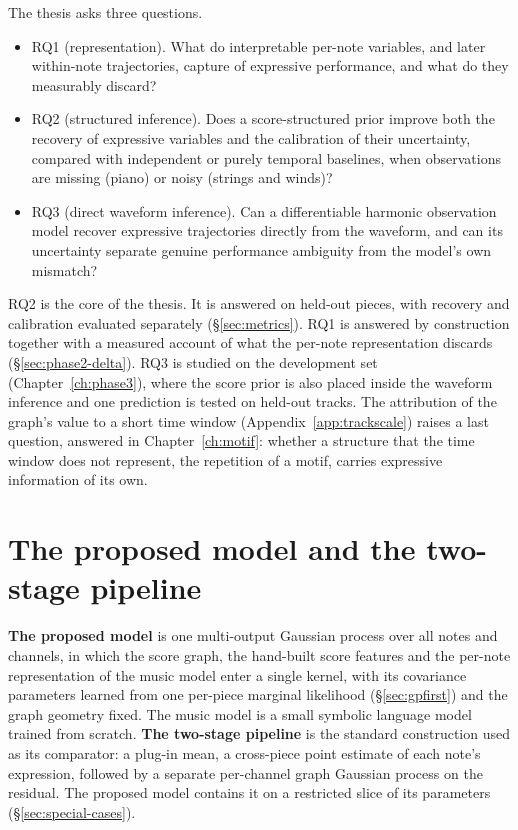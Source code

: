 \documentclass[11pt,a4paper]{report}
\begin{document}
The thesis asks three questions.
\begin{itemize}
  \item RQ1 (representation). What do interpretable per-note variables,
        and later within-note trajectories, capture of expressive
        performance, and what do they measurably discard?
  \item RQ2 (structured inference). Does a score-structured prior improve
        both the recovery of expressive variables and the calibration of
        their uncertainty, compared with independent or purely temporal
        baselines, when observations are missing (piano) or noisy (strings
        and winds)?
  \item RQ3 (direct waveform inference). Can a differentiable harmonic
        observation model recover expressive trajectories directly from
        the waveform, and can its uncertainty separate genuine performance
        ambiguity from the model's own mismatch?
\end{itemize}
RQ2 is the core of the thesis. It is answered on held-out pieces, with
recovery and calibration evaluated separately (\S\ref{sec:metrics}). RQ1 is answered by construction
together with a measured account of what the per-note representation
discards (\S\ref{sec:phase2-delta}). RQ3 is studied on the development set
(Chapter~\ref{ch:phase3}), where the score prior is also placed inside the
waveform inference and one prediction is tested on held-out tracks. The
attribution of the graph's value to a short time window
(Appendix~\ref{app:trackscale}) raises a last question, answered in
Chapter~\ref{ch:motif}: whether a structure that the time window does not
represent, the repetition of a motif, carries expressive information of its
own.

\section{The proposed model and the two-stage pipeline}\label{sec:twostage}
\textbf{The proposed model} is one multi-output Gaussian process over all
notes and channels, in which the score graph, the hand-built score features
and the per-note representation of the music model enter a single kernel,
with its covariance parameters learned from one per-piece marginal
likelihood (\S\ref{sec:gpfirst}) and the graph geometry fixed. The music
model is a small symbolic language model trained from scratch.
\textbf{The two-stage pipeline} is the standard construction used as its
comparator: a plug-in mean, a cross-piece point estimate of each note's
expression, followed by a separate per-channel graph Gaussian process on
the residual. The proposed model contains it on a restricted slice of its
parameters (\S\ref{sec:special-cases}).
\end{document}
